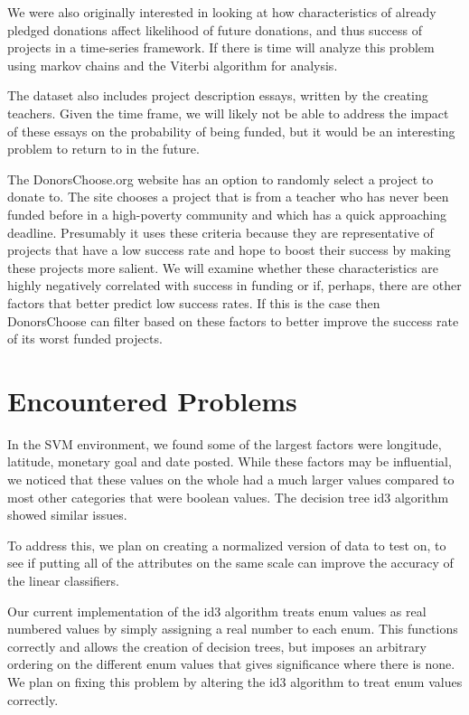 \documentclass{article}
\begin{document}
We were also originally interested in looking at how characteristics of already pledged donations affect likelihood of future donations, and thus success of projects in a time-series framework. If there is time will analyze this problem using markov chains and the Viterbi algorithm for analysis.

The dataset also includes project description essays, written by the creating teachers. Given the time frame, we will likely not be able to address the impact of these essays on the probability of being funded, but it would be an interesting problem to return to in the future.

The DonorsChoose.org website has an option to randomly select a project to donate to. The site chooses a project that is from a teacher who has never been funded before in a high-poverty community and which has a quick approaching deadline. Presumably it uses these criteria because they are representative of projects that have a low success rate and hope to boost their success by making these projects more salient. We will examine whether these characteristics are highly negatively correlated with success in funding or if, perhaps, there are other factors that better predict low success rates. If this is the case then DonorsChoose can filter based on these factors to better improve the success rate of its worst funded projects.

\section{Encountered Problems}

In the SVM environment, we found some of the largest factors were longitude, latitude, monetary goal and date posted.  While these factors may be influential, we noticed that these values on the whole had a much larger values compared to most other categories that were boolean values. The decision tree id3 algorithm showed similar issues.

To address this, we plan on creating a normalized version of data to test on, to see if putting all of the attributes on the same scale can improve the accuracy of the linear classifiers.

Our current implementation of the id3 algorithm treats enum values as real numbered values by simply assigning a real number to each enum. This functions correctly and allows the creation of decision trees, but imposes an arbitrary ordering on the different enum values that gives significance where there is none. We plan on fixing this problem by altering the id3 algorithm to treat enum values correctly.
\end{document}
